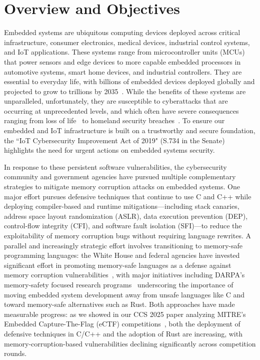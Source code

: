 \section{Overview and Objectives}

Embedded systems are ubiquitous computing devices deployed across critical infrastructure, consumer electronics, medical devices, industrial control systems, and IoT applications.
These systems range from microcontroller units (MCUs) that power sensors and edge devices to more capable embedded processors in automotive systems, smart home devices, and industrial controllers.
They are essential to everyday life, with billions of embedded devices deployed globally and projected to grow to trillions by 2035~\cite{Philip2021route}.
While the benefits of these systems are unparalleled, unfortunately, they are susceptible to cyberattacks that are occurring at unprecedented levels, and which often have severe consequences ranging from loss of life~\cite{FDA2019} to homeland security breaches~\cite{stellios2018survey}.
To ensure our embedded and IoT infrastructure is built on a trustworthy and secure foundation, the ``IoT Cybersecurity Improvement Act of 2019" (S.734 in the Senate)~\cite{s734} highlights the need for urgent actions on embedded systems security.

In response to these persistent software vulnerabilities, the cybersecurity community and government agencies have pursued multiple complementary strategies to mitigate memory corruption attacks on embedded systems.
One major effort pursues defensive techniques that continue to use C and C++ while deploying compiler-based and runtime mitigations—including stack canaries, address space layout randomization (ASLR), data execution prevention (DEP), control-flow integrity (CFI), and software fault isolation (SFI)—to reduce the exploitability of memory corruption bugs without requiring language rewrites.
A parallel and increasingly strategic effort involves transitioning to memory-safe programming languages: the White House and federal agencies have invested significant effort in promoting memory-safe languages as a defense against memory corruption vulnerabilities~\cite{whitehouse2024memory}, with major initiatives including DARPA's memory-safety focused research programs~\cite{darpa2024ssith} underscoring the importance of moving embedded system development away from unsafe languages like C and toward memory-safe alternatives such as Rust.
Both approaches have made measurable progress: as we showed in our CCS 2025 paper analyzing MITRE's Embedded Capture-The-Flag (eCTF) competitions~\cite{ma2025ectf}, both the deployment of defensive techniques in C/C++ and the adoption of Rust are increasing, with memory-corruption-based vulnerabilities declining significantly across competition rounds.

